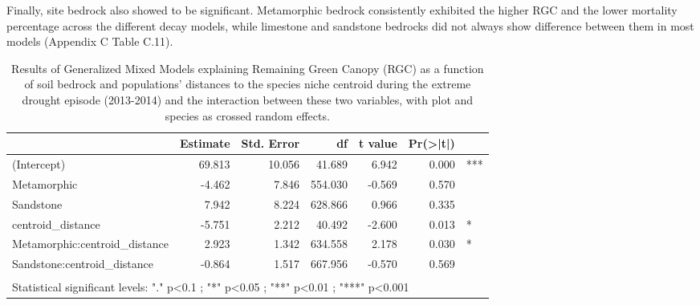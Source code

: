 \documentclass[11pt,twoside]{reedthesis}
\begin{document}
Finally, site bedrock also showed to be significant. Metamorphic bedrock
consistently exhibited the higher RGC and the lower mortality percentage
across the different decay models, while limestone and sandstone
bedrocks did not always show difference between them in most models
(Appendix C Table C.11).\par
\begin{table}[H]

\caption[Model result of Remaining Green Canopy (RGC) as a function of soil bedrock and populations’ distances to species niche centroid]{\label{tab:unnamed-chunk-5}Results of Generalized Mixed Models explaining Remaining Green Canopy (RGC) as a function of soil bedrock and populations’ distances to the species niche centroid during the extreme drought episode (2013-2014) and the interaction between these two variables, with plot and species as crossed random effects.}
\centering
\fontsize{8}{10}\selectfont
\begin{tabular}[t]{lrrrrrl}
\toprule
 & Estimate & Std. Error & df & t value & Pr(>|t|) & \\
\midrule
(Intercept) & 69.813 & 10.056 & 41.689 & 6.942 & 0.000 & ***\\
Metamorphic & -4.462 & 7.846 & 554.030 & -0.569 & 0.570 & \\
Sandstone & 7.942 & 8.224 & 628.866 & 0.966 & 0.335 & \\
centroid\_distance & -5.751 & 2.212 & 40.492 & -2.600 & 0.013 & *\\
Metamorphic:centroid\_distance & 2.923 & 1.342 & 634.558 & 2.178 & 0.030 & *\\
Sandstone:centroid\_distance & -0.864 & 1.517 & 667.956 & -0.570 & 0.569 & \\
\bottomrule
\multicolumn{7}{l}{\textsuperscript{} Statistical significant levels: "." p<0.1 ; "*" p<0.05 ; "**" p<0.01 ; "***" p<0.001}\\
\end{tabular}
\end{table}
\end{document}
